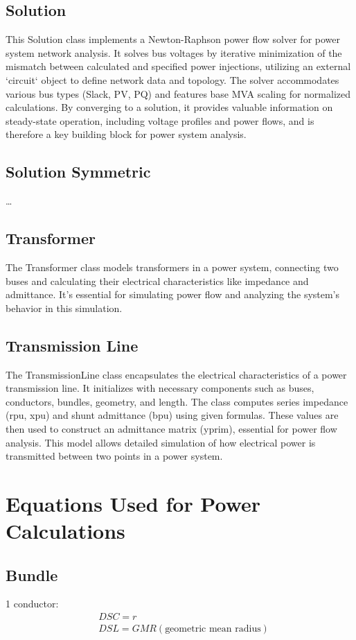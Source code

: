 \documentclass{article}
\begin{document}
	\subsection{Solution}
	This Solution class implements a Newton-Raphson power flow solver for power system network analysis. It solves bus voltages by iterative minimization of the mismatch between calculated and specified power injections, utilizing an external `circuit` object to define network data and topology. The solver accommodates various bus types (Slack, PV, PQ) and features base MVA scaling for normalized calculations. By converging to a solution, it provides valuable information on steady-state operation, including voltage profiles and power flows, and is therefore a key building block for power system analysis.

	\subsection{Solution Symmetric}
	\dots	
	
	\subsection{Transformer}
	The Transformer class models transformers in a power system, connecting two buses and calculating their electrical characteristics like impedance and admittance. It's essential for simulating power flow and analyzing the system's behavior in this simulation.
	
	\subsection{Transmission Line}
	The TransmissionLine class encapsulates the electrical characteristics of a power transmission line. It initializes with necessary components such as buses, conductors, bundles, geometry, and length. The class computes series impedance (rpu, xpu) and shunt admittance (bpu) using given formulas. These values are then used to construct an admittance matrix (yprim), essential for power flow analysis. This model allows detailed simulation of how electrical power is transmitted between two points in a power system.
	
	\section{Equations Used for Power Calculations}

	\subsection*{Bundle}
	1 conductor: \\
	\begin{align*}
		& DSC = r \\
		& DSL = GMR (\text{geometric mean radius})
	\end{align*}
\end{document}
